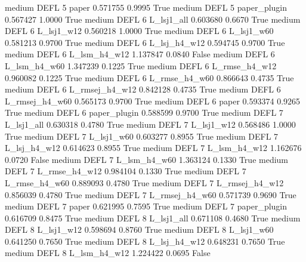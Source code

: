     medium     DEFL                 5          paper   0.571755      0.9995    True
    medium     DEFL                 5   paper_plugin   0.567427      1.0000    True
    medium     DEFL                 6     L_lsj1_all   0.603680      0.6670    True
    medium     DEFL                 6     L_lsj1_w12   0.560218      1.0000    True
    medium     DEFL                 6     L_lsj1_w60   0.581213      0.9700    True
    medium     DEFL                 6   L_lsj_h4_w12   0.594745      0.9700    True
    medium     DEFL                 6   L_lsm_h4_w12   1.137847      0.0840   False
    medium     DEFL                 6   L_lsm_h4_w60   1.347239      0.1225    True
    medium     DEFL                 6  L_rmse_h4_w12   0.960082      0.1225    True
    medium     DEFL                 6  L_rmse_h4_w60   0.866643      0.4735    True
    medium     DEFL                 6 L_rmsej_h4_w12   0.842128      0.4735    True
    medium     DEFL                 6 L_rmsej_h4_w60   0.565173      0.9700    True
    medium     DEFL                 6          paper   0.593374      0.9265    True
    medium     DEFL                 6   paper_plugin   0.588599      0.9700    True
    medium     DEFL                 7     L_lsj1_all   0.630318      0.4780    True
    medium     DEFL                 7     L_lsj1_w12   0.568486      1.0000    True
    medium     DEFL                 7     L_lsj1_w60   0.603277      0.8955    True
    medium     DEFL                 7   L_lsj_h4_w12   0.614623      0.8955    True
    medium     DEFL                 7   L_lsm_h4_w12   1.162676      0.0720   False
    medium     DEFL                 7   L_lsm_h4_w60   1.363124      0.1330    True
    medium     DEFL                 7  L_rmse_h4_w12   0.984104      0.1330    True
    medium     DEFL                 7  L_rmse_h4_w60   0.889093      0.4780    True
    medium     DEFL                 7 L_rmsej_h4_w12   0.856039      0.4780    True
    medium     DEFL                 7 L_rmsej_h4_w60   0.571739      0.9690    True
    medium     DEFL                 7          paper   0.621995      0.7595    True
    medium     DEFL                 7   paper_plugin   0.616709      0.8475    True
    medium     DEFL                 8     L_lsj1_all   0.671108      0.4680    True
    medium     DEFL                 8     L_lsj1_w12   0.598694      0.8760    True
    medium     DEFL                 8     L_lsj1_w60   0.641250      0.7650    True
    medium     DEFL                 8   L_lsj_h4_w12   0.648231      0.7650    True
    medium     DEFL                 8   L_lsm_h4_w12   1.224422      0.0695   False
